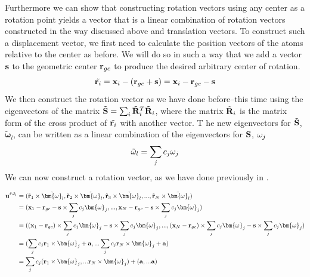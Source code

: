 Furthermore we can show that constructing rotation vectors using any center as a rotation point yields a vector that is a linear combination of rotation vectors constructed in the way discussed
above and translation vectors.  
To construct such a displacement vector, we first need to calculate the position vectors of the atoms relative to the center as before.  We will do 
so in such a way that we add a vector ${\bf{s}}$ to the geometric center ${\bf{r}}_{gc}$ to produce the desired arbitrary center of rotation. 
\begin{equation}
\label{eq:geomrels}
 \tilde{{\bf{r}}_{i}}={\bf{x}}_i-({\bf{r}}_{gc}+{\bf{s}})={\bf{x}}_i-{\bf{r}}_{gc}-{\bf{s}}
\end{equation}
We then construct the rotation vector as we have done before--this time using the eigenvectors of the matrix $\tilde{\bf{S}}= \sum_i \tilde{{\bf{R}}}^T_{i}\tilde{{\bf{R}}}_{i}$, 
where the matrix $\tilde{{\bf{R}}}_{i}$ is the matrix form of the cross product of $\tilde{{\bf{r}}_{i}}$ with another vector.  T
he new eigenvectors for $\tilde{\bf{S}}$, $\tilde{\bm{\omega}}_l$, can be
written as a linear combination of the eigenvectors for ${\bf{S}}$, ${\bf{\omega}}_j$
\begin{equation}
 \tilde{\bf{\omega}}_l = \sum_j c_j {\bf{\omega}}_j
\end{equation}
We can now construct a rotation vector, as we have done previously in .
\begin{widetext}
\begin{equation}
 \begin{split}
  {\bf{u}}^{\tilde{r}\tilde{\omega_l}}&=(\tilde{\bf{r}}_{1}\times \tilde{\bm{\omega}}_l, \tilde{\bf{r}}_{2}\times \tilde{\bm{\omega}}_l, \tilde{\bf{r}}_{3}\times \tilde{\bm{\omega}}_l, . . .,\tilde{\bf{r}}_{N}\times \tilde{\bm{\omega}}_l)\\
  &=({\bf{x}}_1-{\bf{r}}_{gc}-{\bf{s}} \times \sum_j c_j {\bm{\omega}}_j, . . .,{\bf{x}}_N-{\bf{r}}_{gc}-{\bf{s}} \times \sum_j c_j {\bm{\omega}}_j) \\
  &=(({\bf{x}}_1-{\bf{r}}_{gc})\times \sum_j c_j {\bm{\omega}}_j-{\bf{s}} \times \sum_j c_j {\bm{\omega}}_j, . . .,({\bf{x}}_N-{\bf{r}}_{gc})\times \sum_j c_j {\bm{\omega}}_j-{\bf{s}} \times \sum_j c_j {\bm{\omega}}_j) \\
  &=(\sum_j c_j {{\bf{r}}_{1}}\times {\bm{\omega}}_j + {\bf{a}}, . . . \sum_j c_j {{\bf{r}}_{N}}\times {\bm{\omega}}_j + {\bf{a}})\\
  &=\sum_j c_j ({\bf{r}}_{1}\times {\bm{\omega}}_j, . . .{{\bf{r}}_{N}}\times {\bm{\omega}}_j)+({\bf{a}}, . . .{\bf{a}})
 \end{split}
\end{equation}
\end{widetext}
